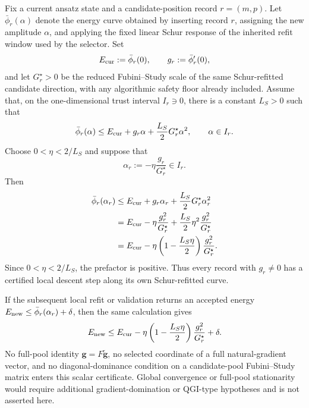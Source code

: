 \documentclass[
  reprint,
  amsmath,
  amssymb,
  aps,
  pra,
  nofootinbib,
  superscriptaddress,
  floatfix
]{revtex4-2}
\begin{document}
Fix a current ansatz state and a candidate-position record \(r=(m,p)\).
Let \(\bar\phi_r(\alpha)\) denote the energy curve obtained by inserting
record \(r\), assigning the new amplitude \(\alpha\), and applying the
fixed linear Schur response of the inherited refit window used by the
selector. Set
\[
E_{\rm cur}:=\bar\phi_r(0),
\qquad
g_r:=\bar\phi_r'(0),
\]
and let \(G_r^\star>0\) be the reduced Fubini--Study scale of the same
Schur-refitted candidate direction, with any algorithmic safety floor
already included. Assume that, on the one-dimensional trust interval
\(I_r\ni0\), there is a constant \(L_S>0\) such that
\begin{equation}
\bar\phi_r(\alpha)
\le
E_{\rm cur}
+
g_r\alpha
+
\frac{L_S}{2}G_r^\star\alpha^2,
\qquad
\alpha\in I_r .
\label{eq:schur_scalar_smoothness}
\end{equation}
Choose \(0<\eta<2/L_S\) and suppose that
\[
\alpha_r:=-\eta\frac{g_r}{G_r^\star}\in I_r .
\]
Then
\begin{align}
\bar\phi_r(\alpha_r)
&\le
E_{\rm cur}
+
g_r\alpha_r
+
\frac{L_S}{2}G_r^\star\alpha_r^2
\nonumber\\
&=
E_{\rm cur}
-
\eta\frac{g_r^2}{G_r^\star}
+
\frac{L_S}{2}\eta^2\frac{g_r^2}{G_r^\star}
\nonumber\\
&=
E_{\rm cur}
-
\eta\left(1-\frac{L_S\eta}{2}\right)
\frac{g_r^2}{G_r^\star}.
\label{eq:schur_one_record_descent}
\end{align}
Since \(0<\eta<2/L_S\), the prefactor is positive. Thus every record
with \(g_r\neq0\) has a certified local descent step along its own
Schur-refitted curve.

If the subsequent local refit or validation returns an accepted energy
\(E_{\rm new}\le\bar\phi_r(\alpha_r)+\delta\), then the same calculation
gives
\[
E_{\rm new}
\le
E_{\rm cur}
-
\eta\left(1-\frac{L_S\eta}{2}\right)
\frac{g_r^2}{G_r^\star}
+
\delta .
\]
No full-pool identity \(\mathbf g=F\tilde{\mathbf g}\), no selected
coordinate of a full natural-gradient vector, and no diagonal-dominance
condition on a candidate-pool Fubini--Study matrix enters this scalar
certificate. Global convergence or full-pool stationarity would require
additional gradient-domination or QGI-type hypotheses and is not asserted
here.
\end{document}
